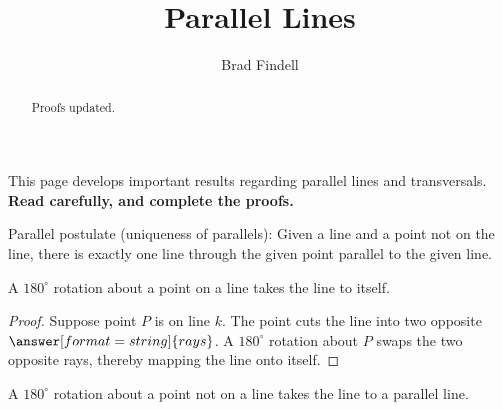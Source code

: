 \documentclass[nooutcomes]{ximera}
\title{Parallel Lines}
\author{Brad Findell}
\begin{document}
\begin{abstract}
Proofs updated. 
\end{abstract}
\maketitle

This page develops important results regarding parallel lines and transversals.  \textbf{Read carefully, and complete the proofs.} 

\begin{axiom}
Parallel postulate (uniqueness of parallels):  Given a line and a point not on the line, there is exactly one line through the given point parallel to the given line.  
\end{axiom}

\begin{theorem}
A $180^\circ$ rotation about a point on a line takes the line to itself. 
\end{theorem}

\begin{problem}
\begin{proof}
Suppose point $P$ is on line $k$.  The point cuts the line into two opposite $\answer[format=string]{rays}$.  A $180^\circ$ rotation about $P$ swaps the two opposite rays, thereby mapping the line onto itself.  
\end{proof}
\end{problem}

\begin{theorem}
A $180^\circ$ rotation about a point not on a line takes the line to a parallel line.
\end{theorem}
\end{document}
